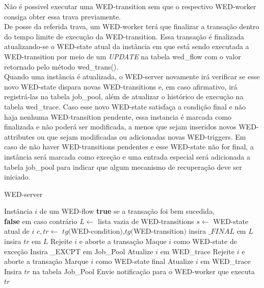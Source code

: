 \documentclass[conference]{IEEEtran}
\begin{document}
Não é possivel executar uma WED-transition sem que o respectivo WED-worker consiga obter essa trava previamente.
\\
\indent De posse da referida trava, um WED-worker terá que finalizar a transação dentro do tempo limite de execução da WED-transition.
Essa transação é finalizada atualizando-se o WED-state atual da instância em que está sendo executada a WED-transition por meio
de um \emph{UPDATE} na tabela wed\_flow com o valor retornado pelo método wed\_trans().
\\
\indent Quando uma instância é atualizada, o WED-server novamente irá verificar se esse novo WED-state dispara novas WED-transitions
e, em caso afirmativo, irá registrá-las na tabela job\_pool, além de atualizar o histórico de execução na tabela wed\_trace. 
Caso esse novo WED-state satisfaça a condição final e não haja nenhuma WED-transition pendente, essa instancia é marcada como finalizada e não poderá ser
modificada, a menos que sejam inseridos novos WED-attributes ou que sejam modificadas ou adicionadas novas WED-triggers. Em
caso de não haver WED-transitions pendentes e esse WED-state não for final, a instância será marcada como exceção e uma
entrada especial será adicionada a tabela job\_pool para indicar que algum mecanismo de recuperação deve ser iniciado.
\begin{algorithm}
\caption{WED-server}
\label{alg1}
\begin{algorithmic}[1]
\REQUIRE Instância $i$ de um WED-flow
\ENSURE \textbf{true} se a transação foi bem sucedida,\\
         \hspace{23pt}\textbf{false} em caso contrário
\STATE $L \leftarrow$ lista vazia de WED-transitions 
\STATE $s \leftarrow$ WED-state atual de $i$
\STATE $c,tr \leftarrow$ $tg($WED-condition$)$,$tg($WED-transition$)$
\STATE insira $\_FINAL$ em $L$
\ELSE
\STATE insira $tr$ em $L$
\ENDIF
\ENDIF
\ENDFOR
{}
\STATE Rejeite $i$ e aborte a transação
\RETURN \FALSE
{}
\STATE Maque $i$ como WED-state de exceção
\STATE Insira \_EXCPT em Job\_Pool
\ENDIF
\STATE Atualize $i$ em WED\_trace
\RETURN \TRUE
{}
\STATE Rejeite $i$ e aborte a transação
\RETURN \FALSE
\ELSE
\STATE Marque $i$ como WED-state final
\STATE Atualize $i$ em WED\_trace
\RETURN \TRUE
\ENDIF
\ELSE
{}
\STATE Insira $tr$ na tabela Job\_Pool
\STATE Envie notificação para o WED-worker que executa $tr$
\RETURN \TRUE
\ENDFOR
\ENDIF

\end{algorithmic}
\end{algorithm}
\end{document}
